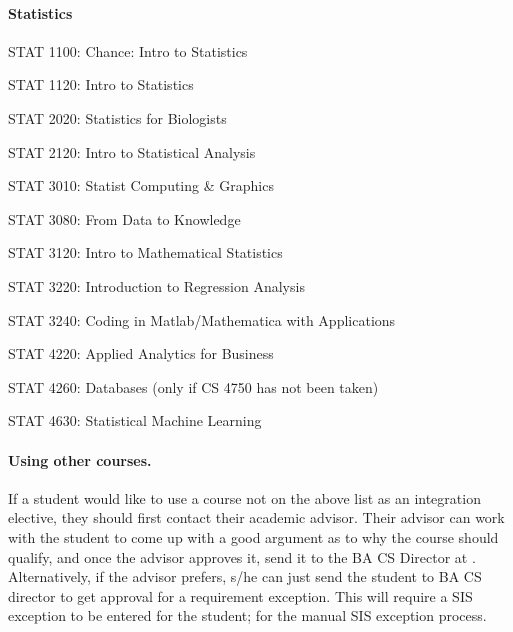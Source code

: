 \paragraph{Statistics}
\begin{itemlist}
\item STAT 1100: Chance: Intro to Statistics
\item STAT 1120: Intro to Statistics
\item STAT 2020: Statistics for Biologists
\item STAT 2120: Intro to Statistical Analysis
\item STAT 3010: Statist Computing \& Graphics
\item STAT 3080: From Data to Knowledge
\item STAT 3120: Intro to Mathematical Statistics
\item STAT 3220: Introduction to Regression Analysis
\item STAT 3240: Coding in Matlab/Mathematica with Applications
\item STAT 4220: Applied Analytics for Business
\item STAT 4260: Databases (only if CS 4750 has not been taken)
\item STAT 4630: Statistical Machine Learning
\end{itemlist}



\paragraph{Using other courses.}  If a student would like to use a
course not on the above list as an integration elective, they should
first contact their academic advisor.  Their advisor can work with the
student to come up with a good argument as to why the course should
qualify, and once the advisor approves it, send it to the BA CS
Director at \bacsdirectoremail.  Alternatively, if the advisor
prefers, s/he can just send the student to BA CS director to get
approval for a requirement exception.  This will require a SIS
exception to be entered for the student;
for the manual SIS exception process.
